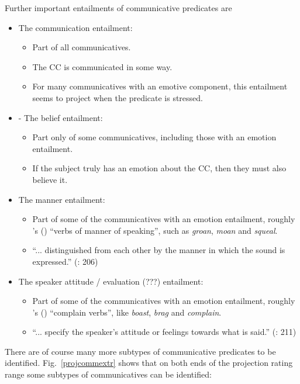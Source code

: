 \documentclass[11pt,fleqn]{article}
\newcommand{\figref}[1]{Fig.~\ref{#1}}
\newcommand{\6}{\mbox{$[\hspace*{-.6mm}[$}}
\newcommand{\9}{\mbox{$]\hspace*{-.6mm}]$}}
\newcommand{\citepos}[1]{\citeauthor{#1}'s (\citeyear{#1})}
\begin{document}
\noindent Further important entailments of communicative predicates are
\begin{itemize}
	\item The communication entailment:
	\begin{itemize}
		\item Part of all communicatives.
		\item The CC is communicated in some way.
		\item For many communicatives with an emotive component, this entailment seems to project when the predicate is stressed.
	\end{itemize}
	\item -	The belief entailment:
	\begin{itemize}
		\item Part only of some communicatives, including those with an emotion entailment.
		\item If the subject truly has an emotion about the CC, then they must also believe it. 
	\end{itemize}
	\item The manner entailment:
	\begin{itemize}
		\item Part of some of the communicatives with an emotion entailment, roughly \citepos{levin1993} ``verbs of manner of speaking”, such as \emph{groan}, \emph{moan} and \emph{squeal}.
		\item ``... distinguished from each other by the manner in which the sound is expressed.” (\citealt{levin1993}: 206)
	\end{itemize}
	\item The speaker attitude / evaluation (???) entailment:
	\begin{itemize}
		\item Part of some of the communicatives with an emotion entailment, roughly \citepos{levin1993} ``complain verbs”, like \emph{boast}, \emph{brag} and \emph{complain}.
		\item ``... specify the speaker’s attitude or feelings towards what is said.” (\citealt{levin1993}: 211)
	\end{itemize}
\end{itemize}

There are of course many more subtypes of communicative predicates to be identified. \figref{projcommextr} shows that on both ends of the projection rating range some subtypes of communicatives can be identified: 
\end{document}

